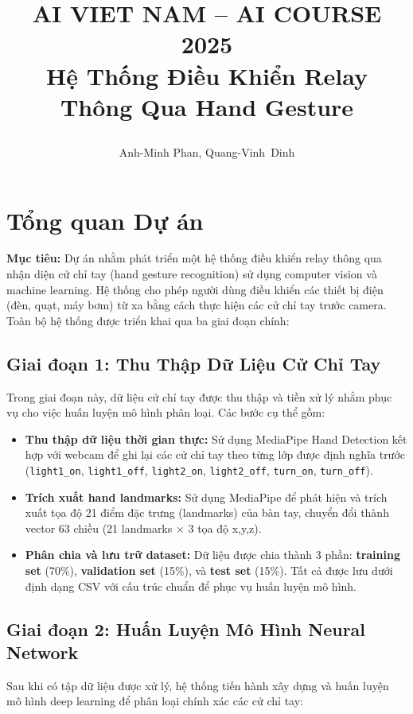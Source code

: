 \documentclass[12pt]{article}
\title{%
  \begin{center}
        \Large {AI VIET NAM -- AI COURSE 2025}\\[.5ex]  
        \Huge \textbf{Hệ Thống Điều Khiển Relay Thông Qua Hand Gesture}\\[.5ex]
  \end{center}
}
\author{
        \begin{minipage}{\textwidth}
        \centering
        {
          Anh-Minh Phan,\quad
          Quang-Vinh~Dinh
        }\\
      \end{minipage}
    }
\date{}
\begin{document}
\maketitle

\section{Tổng quan Dự án}

\textbf{Mục tiêu:}  
Dự án nhằm phát triển một hệ thống điều khiển relay thông qua nhận diện cử chỉ tay (hand gesture recognition) sử dụng computer vision và machine learning. Hệ thống cho phép người dùng điều khiển các thiết bị điện (đèn, quạt, máy bơm) từ xa bằng cách thực hiện các cử chỉ tay trước camera. Toàn bộ hệ thống được triển khai qua ba giai đoạn chính:

\subsection{Giai đoạn 1: Thu Thập Dữ Liệu Cử Chỉ Tay}
Trong giai đoạn này, dữ liệu cử chỉ tay được thu thập và tiền xử lý nhằm phục vụ cho việc huấn luyện mô hình phân loại. Các bước cụ thể gồm:

\begin{itemize}
    \item \textbf{Thu thập dữ liệu thời gian thực:}  
    Sử dụng MediaPipe Hand Detection kết hợp với webcam để ghi lại các cử chỉ tay theo từng lớp được định nghĩa trước (\texttt{light1\_on}, \texttt{light1\_off}, \texttt{light2\_on}, \texttt{light2\_off}, \texttt{turn\_on}, \texttt{turn\_off}).

    \item \textbf{Trích xuất hand landmarks:}  
    Sử dụng MediaPipe để phát hiện và trích xuất tọa độ 21 điểm đặc trưng (landmarks) của bàn tay, chuyển đổi thành vector 63 chiều (21 landmarks × 3 tọa độ x,y,z).

    \item \textbf{Phân chia và lưu trữ dataset:}  
    Dữ liệu được chia thành 3 phần: \textbf{training set} (70\%), \textbf{validation set} (15\%), và \textbf{test set} (15\%). Tất cả được lưu dưới định dạng CSV với cấu trúc chuẩn để phục vụ huấn luyện mô hình.
\end{itemize}

\subsection{Giai đoạn 2: Huấn Luyện Mô Hình Neural Network}
Sau khi có tập dữ liệu được xử lý, hệ thống tiến hành xây dựng và huấn luyện mô hình deep learning để phân loại chính xác các cử chỉ tay:
\end{document}
